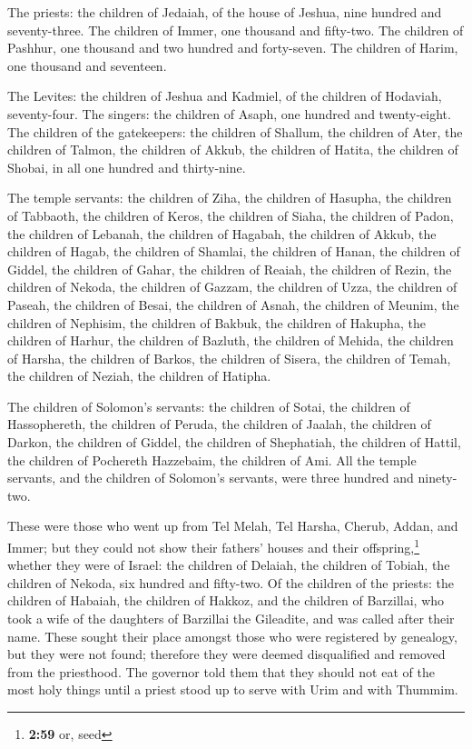  The priests: the children of Jedaiah, of the house of
Jeshua, nine hundred and seventy-three.  The children of
Immer, one thousand and fifty-two.  The children of
Pashhur, one thousand and two hundred and forty-seven. 
The children of Harim, one thousand and seventeen.

 The Levites: the children of Jeshua and Kadmiel, of the
children of Hodaviah, seventy-four.  The singers: the
children of Asaph, one hundred and twenty-eight.  The
children of the gatekeepers: the children of Shallum, the children of
Ater, the children of Talmon, the children of Akkub, the children of
Hatita, the children of Shobai, in all one hundred and thirty-nine.

 The temple servants: the children of Ziha, the children
of Hasupha, the children of Tabbaoth,  the children of
Keros, the children of Siaha, the children of Padon,  the
children of Lebanah, the children of Hagabah, the children of Akkub,
 the children of Hagab, the children of Shamlai, the
children of Hanan,  the children of Giddel, the children
of Gahar, the children of Reaiah,  the children of Rezin,
the children of Nekoda, the children of Gazzam,  the
children of Uzza, the children of Paseah, the children of Besai,
 the children of Asnah, the children of Meunim, the
children of Nephisim,  the children of Bakbuk, the
children of Hakupha, the children of Harhur,  the
children of Bazluth, the children of Mehida, the children of Harsha,
 the children of Barkos, the children of Sisera, the
children of Temah,  the children of Neziah, the children
of Hatipha.

 The children of Solomon's servants: the children of
Sotai, the children of Hassophereth, the children of Peruda,
 the children of Jaalah, the children of Darkon, the
children of Giddel,  the children of Shephatiah, the
children of Hattil, the children of Pochereth Hazzebaim, the children of
Ami.  All the temple servants, and the children of
Solomon's servants, were three hundred and ninety-two.

 These were those who went up from Tel Melah, Tel Harsha,
Cherub, Addan, and Immer; but they could not show their fathers' houses
and their offspring,\footnote{\textbf{2:59} or, seed} whether they were
of Israel:  the children of Delaiah, the children of
Tobiah, the children of Nekoda, six hundred and fifty-two.
 Of the children of the priests: the children of Habaiah,
the children of Hakkoz, and the children of Barzillai, who took a wife
of the daughters of Barzillai the Gileadite, and was called after their
name.  These sought their place amongst those who were
registered by genealogy, but they were not found; therefore they were
deemed disqualified and removed from the priesthood.  The
governor told them that they should not eat of the most holy things
until a priest stood up to serve with Urim and with Thummim.


